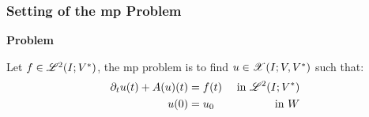 \begin{frame}
    \frametitle{Setting of the \acrfull{mp} Problem}

    \vspace*{\fill}
    \begin{center}
        {\color{\accentcolor} \Large \textbf{Problem}}
        \vspace*{0.25cm}

        \begin{minipage}{0.75\textwidth}
            \begin{definition}
                Let $f \in \mathscr{L}^{2}(I; V^*)$, the \acrshort{mp} problem is to find $u \in \mathscr{X}(I; V, V^*)$ such that:
                \begin{align*}
                        \partial_t u(t) + A(u)(t) &= f(t) & \text{ in } \mathscr{L}^{2}(I; V^*) \\
                        u(0) &= u_0 & \text{ in } W
                \end{align*}
            \end{definition}
        \end{minipage}
    \end{center}
    \vspace*{\fill}
    
\end{frame}

